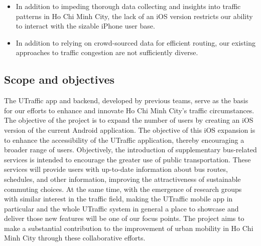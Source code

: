 \begin{itemize}
    \item In addition to impeding thorough data collecting and insights into traffic patterns in Ho Chi Minh City, the lack of an iOS version restricts our ability to interact with the sizable iPhone user base.
    
    \item In addition to relying on crowd-sourced data for efficient routing, our existing approaches to traffic congestion are not sufficiently diverse.
\end{itemize}


\subsection{Scope and objectives}

The UTraffic app and backend, developed by previous teams, serve as the basis for our efforts to enhance and innovate Ho Chi Minh City's traffic circumstances. The objective of the project is to expand the number of users by creating an iOS version of the current Android application. The objective of this iOS expansion is to enhance the accessibility of the UTraffic application, thereby encouraging a broader range of users. Objectively, the introduction of supplementary bus-related services is intended to encourage the greater use of public transportation. These services will provide users with up-to-date information about bus routes, schedules, and other information, improving the attractiveness of sustainable commuting choices. At the same time, with the emergence of research groups with similar interest in the traffic field, making the UTraffic mobile app in particular and the whole UTraffic system in general a place to showcase and deliver those new features will be one of our focus points. The project aims to make a substantial contribution to the improvement of urban mobility in Ho Chi Minh City through these collaborative efforts.